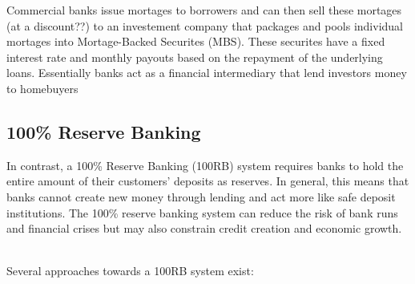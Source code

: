 Commercial banks issue mortages to borrowers and can then sell these mortages (at a discount??) to an investement company that packages and pools individual mortages into Mortage-Backed Securites (MBS). These securites have a fixed interest rate and monthly payouts based on the repayment of the underlying loans. Essentially banks act as a financial intermediary that lend investors money to homebuyers



\subsection{100\% Reserve Banking}
In contrast, a 100\% Reserve Banking (100RB) system requires banks to hold the entire amount of their customers' deposits as reserves. In general, this means that banks cannot create new money through lending and act more like safe deposit institutions. The 100\% reserve banking system can reduce the risk of bank runs and financial crises but may also constrain credit creation and economic growth.     


Several approaches towards a 100RB system exist:

